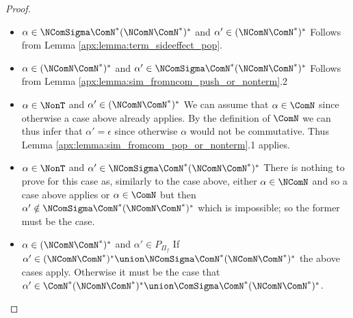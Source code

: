 \begin{proof}
\begin{itemize}
\begin{itemize}
\begin{itemize}
					$\Pi_{k+1} =\cproc{\alpha'} \parallel \Pi'_k \oplus \Pi(w)$
					and
					$\Gamma_{k+1} = \Gamma_k \oplus \Gamma{w}$.
					Lemma \ref{apx:lemma:leftmost_term_simulation} then allows us to conclude that
					$\M\seqpar{\cproc{X\alpha_0\alpha_1} \parallel \Pi'_k} \ChanPar \Gamma_k 
					\toCM^* 
				    \M\seqpar{\cproc{X'\alpha_2\alpha_0\alpha_1} \parallel \Pi'_k} \ChanPar \Gamma_k$ and
				    Lemma \ref{apx:lemma:sim_fromcom_pop_or_nonterm}.1 gives us
				    $\M\seqpar{\cproc{X'\alpha_2\alpha_0\alpha_1} \parallel \Pi'_k} \ChanPar \Gamma_k \toCM^*
				    \M\seqpar{\cproc{\alpha_1} \parallel \Pi'_k \oplus \Pi(w)} \ChanPar \Gamma_k \oplus \Gamma(w) = \Pi_{k+1} \ChanPar \Gamma_{k+1}$.
			\item Case $\alpha'_0 \neq \epsilon$.\newline
				Follows directly from Lemma \ref{apx:lemma:sim_fromncom_push_or_nonterm}.1
		\end{itemize}
		\item $\alpha \in \NComSigma\ComN^*(\NComN\ComN^*)^*$ and $\alpha' \in (\NComN\ComN^*)^*$ \newline
		Follows from Lemma \ref{apx:lemma:term_sideeffect_pop}.
		\item $\alpha \in (\NComN\ComN^*)^*$ and $\alpha' \in \NComSigma\ComN^*(\NComN\ComN^*)^*$ \newline
		Follows from Lemma \ref{apx:lemma:sim_fromncom_push_or_nonterm}.2
		\item $\alpha \in \NonT$ and $\alpha' \in (\NComN\ComN^*)^*$\newline
		We can assume that $\alpha \in \ComN$ since otherwise a case above already applies.
		By the definition of $\ComN$ we can thus infer that $\alpha' = \epsilon$ since otherwise 
		$\alpha$ would not be commutative.
		Thus Lemma \ref{apx:lemma:sim_fromcom_pop_or_nonterm}.1 applies.
		\item $\alpha \in \NonT$ and $\alpha' \in \NComSigma\ComN^*(\NComN\ComN^*)^*$\newline
		There is nothing to prove for this case as, similarly to the case above, either $\alpha \in \NComN$ and so a case above applies or $\alpha \in \ComN$ but then $\alpha' \notin \NComSigma\ComN^*(\NComN\ComN^*)^*$ which is impossible; so the former must be the case.
		\item $\alpha \in (\NComN\ComN^*)^*$ and $\alpha' \in P_{\Pi_f}$\newline
			If $\alpha' \in (\NComN\ComN^*)^* \union \NComSigma\ComN^*(\NComN\ComN^*)^*$ the above cases apply. Otherwise it must be the case that $\alpha' \in \ComN^*(\NComN\ComN^*)^* \union \ComSigma\ComN^*(\NComN\ComN^*)^*$.

\end{itemize}
\end{itemize}
\end{proof}
